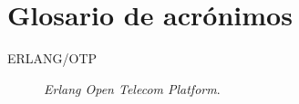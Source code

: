 \chapter{Glosario de acrónimos}
\label{chap:acronimos}


\begin{description}
 \item [ERLANG/OTP] \emph{Erlang Open Telecom Platform}.
\end{description}

